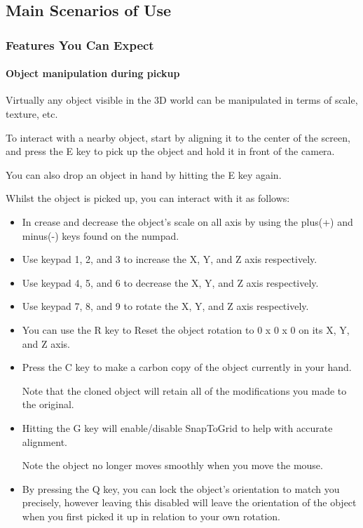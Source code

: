 \documentclass{article}
\begin{document}
	\subsection{Main Scenarios of Use}

		\subsubsection{Features You Can Expect}

			\paragraph{Object manipulation during pickup}

			Virtually any object visible in the 3D world can be manipulated in terms of scale, texture, etc.

			To interact with a nearby object, start by aligning it to the center of the screen, and press the E key to pick up the object and hold it in front of the camera.

			You can also drop an object in hand by hitting the E key again.

			Whilst the object is picked up, you can interact with it as follows:

			\begin{itemize}

				\item In crease and decrease the object's scale on all axis by using the plus(+) and minus(-) keys found on the numpad.

				\item Use keypad 1, 2, and 3 to increase the X, Y, and Z axis respectively.

				\item Use keypad 4, 5, and 6 to decrease the X, Y, and Z axis respectively.

				\item Use keypad 7, 8, and 9 to rotate the X, Y, and Z axis respectively.

				\item You can use the R key to Reset the object rotation to 0 x 0 x 0 on its X, Y, and Z axis.

				\item Press the C key to make a carbon copy of the object currently in your hand.

				Note that the cloned object will retain all of the modifications you made to the original.

				\item Hitting the G key will enable/disable SnapToGrid to help with accurate alignment.

				Note the object no longer moves smoothly when you move the mouse.

				\item By pressing the Q key, you can lock the object's orientation to match you precisely, however leaving this disabled will leave the orientation of the object when you first picked it up in relation to your own rotation.

			\end{itemize}
\end{document}
